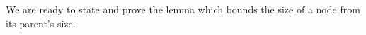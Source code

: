 

We are ready to state and prove the lemma which bounds the size of a node from its parent's size.


